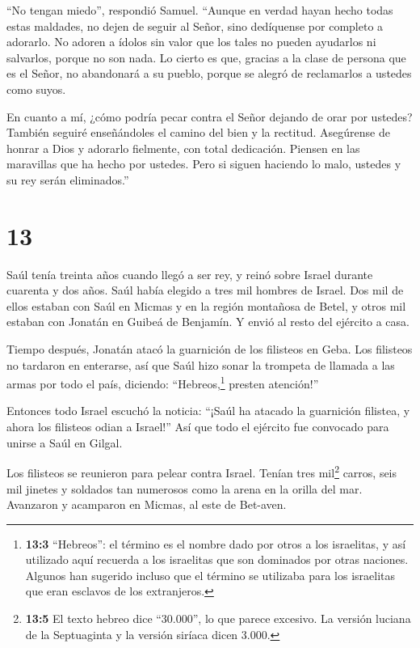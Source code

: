  ``No tengan miedo'', respondió Samuel. ``Aunque en verdad
hayan hecho todas estas maldades, no dejen de seguir al Señor, sino
dedíquense por completo a adorarlo.  No adoren a ídolos sin
valor que los tales no pueden ayudarlos ni salvarlos, porque no son
nada.  Lo cierto es que, gracias a la clase de persona que
es el Señor, no abandonará a su pueblo, porque se alegró de reclamarlos
a ustedes como suyos.

 En cuanto a mí, ¿cómo podría pecar contra el Señor dejando
de orar por ustedes? También seguiré enseñándoles el camino del bien y
la rectitud.  Asegúrense de honrar a Dios y adorarlo
fielmente, con total dedicación. Piensen en las maravillas que ha hecho
por ustedes.  Pero si siguen haciendo lo malo, ustedes y su
rey serán eliminados.''

\hypertarget{section-12}{%
\section{13}\label{section-12}}

 Saúl tenía treinta años cuando llegó a ser rey, y reinó
sobre Israel durante cuarenta y dos años.  Saúl había
elegido a tres mil hombres de Israel. Dos mil de ellos estaban con Saúl
en Micmas y en la región montañosa de Betel, y otros mil estaban con
Jonatán en Guibeá de Benjamín. Y envió al resto del ejército a casa.

 Tiempo después, Jonatán atacó la guarnición de los
filisteos en Geba. Los filisteos no tardaron en enterarse, así que Saúl
hizo sonar la trompeta de llamada a las armas por todo el país,
diciendo: ``Hebreos,\footnote{\textbf{13:3} ``Hebreos'': el término es
  el nombre dado por otros a los israelitas, y así utilizado aquí
  recuerda a los israelitas que son dominados por otras naciones.
  Algunos han sugerido incluso que el término se utilizaba para los
  israelitas que eran esclavos de los extranjeros.} presten atención!''

 Entonces todo Israel escuchó la noticia: ``¡Saúl ha atacado
la guarnición filistea, y ahora los filisteos odian a Israel!'' Así que
todo el ejército fue convocado para unirse a Saúl en Gilgal.

 Los filisteos se reunieron para pelear contra Israel.
Tenían tres mil\footnote{\textbf{13:5} El texto hebreo dice ``30.000'',
  lo que parece excesivo. La versión luciana de la Septuaginta y la
  versión siríaca dicen 3.000.} carros, seis mil jinetes y soldados tan
numerosos como la arena en la orilla del mar. Avanzaron y acamparon en
Micmas, al este de Bet-aven.

